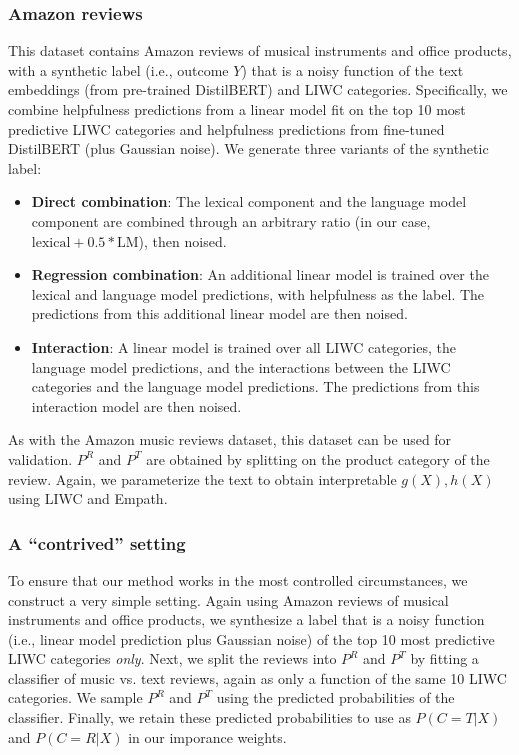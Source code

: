 \documentclass{article}
\begin{document}
\subsubsection{Amazon reviews}

This dataset contains Amazon reviews of musical instruments and office products, with a synthetic label (i.e., outcome $Y$) that is a noisy function of the text embeddings (from pre-trained DistilBERT) and LIWC categories. Specifically, we combine helpfulness predictions from a linear model fit on the top 10 most predictive LIWC categories and helpfulness predictions from fine-tuned DistilBERT (plus Gaussian noise). We generate three variants of the synthetic label:
\begin{itemize}
    \item \textbf{Direct combination}: The lexical component and the language model component are combined through an arbitrary ratio (in our case, $\text{lexical} + 0.5*\text{LM}$), then noised.
    \item \textbf{Regression combination}: An additional linear model is trained over the lexical and language model predictions, with helpfulness as the label. The predictions from this additional linear model are then noised.
    \item \textbf{Interaction}: A linear model is trained over all LIWC categories, the language model predictions, and the interactions between the LIWC categories and the language model predictions. The predictions from this interaction model are then noised.
\end{itemize}

As with the Amazon music reviews dataset, this dataset can be used for validation. $P^R$ and $P^T$ are obtained by splitting on the product category of the review. Again, we parameterize the text to obtain interpretable $g(X), h(X)$ using LIWC and Empath.

\subsubsection{A ``contrived'' setting}
\label{sec:contrived_data}

To ensure that our method works in the most controlled circumstances, we construct a very simple setting. Again using Amazon reviews of musical instruments and office products, we synthesize a label that is a noisy function (i.e., linear model prediction plus Gaussian noise) of the top 10 most predictive LIWC categories \textit{only}. Next, we split the reviews into $P^R$ and $P^T$ by fitting a classifier of music vs. text reviews, again as only a function of the same 10 LIWC categories. We sample $P^R$ and $P^T$ using the predicted probabilities of the classifier. Finally, we retain these predicted probabilities to use as $P(C=T|X)$ and $P(C=R|X)$ in our imporance weights.
\end{document}
